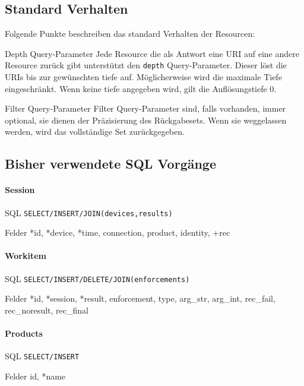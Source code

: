 \documentclass[10pt,a4paper]{scrartcl}
\begin{document}
\subsection{Standard Verhalten}
Folgende Punkte beschreiben das standard Verhalten der Resourcen:
\begin{description*}
    \item[Depth Query-Parameter] Jede Resource die als Antwort eine URI auf eine andere Resource zurück gibt                         unterstützt den \texttt{depth} Query-Parameter. Dieser löst die URIs bis zur gewünschten tiefe auf. Möglicherweise wird die maximale Tiefe eingeschränkt. Wenn keine tiefe angegeben wird, gilt die Auflösungstiefe 0.
    \item[Filter Query-Parameter] Filter Query-Parameter sind, falls vorhanden, immer optional, sie dienen der Präzisierung des Rückgabesets. Wenn sie weggelassen werden, wird das vollständige Set zurückgegeben.
\end{description*}
 
\subsection{Bisher verwendete SQL Vorgänge}
\paragraph{Session}
\begin{description*}
	\item[SQL] \texttt{SELECT/INSERT/JOIN(devices,results)}
	\item[Felder] *id, *device, *time, connection, product, identity, +rec
\end{description*}

\paragraph{Workitem}
\begin{description*}
	\item[SQL] \texttt{SELECT/INSERT/DELETE/JOIN(enforcements)}
	\item[Felder] *id, *session, *result, enforcement, type, arg\_str, arg\_int, rec\_fail, rec\_noresult, rec\_final
\end{description*} 
 
\paragraph{Products}
\begin{description*}
	\item[SQL] \texttt{SELECT/INSERT}
	\item[Felder] id, *name
\end{description*}
\end{document}
